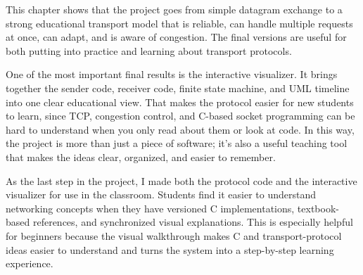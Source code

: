 This chapter shows that the project goes from simple datagram exchange to a
strong educational transport model that is reliable, can handle multiple
requests at once, can adapt, and is aware of congestion. The final versions are
useful for both putting into practice and learning about transport protocols.

One of the most important final results is the interactive visualizer. It brings
together the sender code, receiver code, finite state machine, and UML timeline
into one clear educational view. That makes the protocol easier for new
students to learn, since TCP, congestion control, and C-based socket
programming can be hard to understand when you only read about them or look at
code. In this way, the project is more than just a piece of software; it's also
a useful teaching tool that makes the ideas clear, organized, and easier to
remember.

As the last step in the project, I made both the protocol code and the
interactive visualizer for use in the classroom. Students find it easier to
understand networking concepts when they have versioned C implementations,
textbook-based references, and synchronized visual explanations. This is
especially helpful for beginners because the visual walkthrough makes C and
transport-protocol ideas easier to understand and turns the system into a
step-by-step learning experience.
